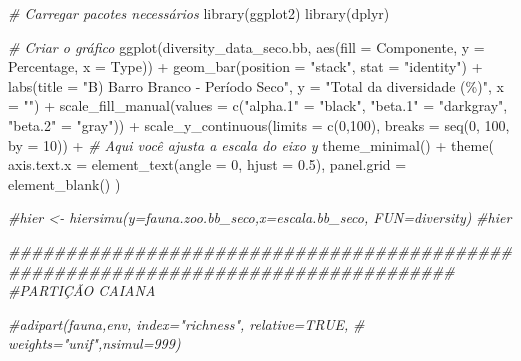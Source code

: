 \documentclass[
  letterpaper,
  DIV=11,
  numbers=noendperiod]{scrartcl}
\newenvironment{Shaded}{}{}
\newcommand{\AttributeTok}[1]{\textcolor[rgb]{0.49,0.56,0.16}{#1}}
\newcommand{\CommentTok}[1]{\textcolor[rgb]{0.38,0.63,0.69}{\textit{#1}}}
\newcommand{\DecValTok}[1]{\textcolor[rgb]{0.25,0.63,0.44}{#1}}
\newcommand{\DocumentationTok}[1]{\textcolor[rgb]{0.73,0.13,0.13}{\textit{#1}}}
\newcommand{\FloatTok}[1]{\textcolor[rgb]{0.25,0.63,0.44}{#1}}
\newcommand{\FunctionTok}[1]{\textcolor[rgb]{0.02,0.16,0.49}{#1}}
\newcommand{\NormalTok}[1]{#1}
\newcommand{\OtherTok}[1]{\textcolor[rgb]{0.00,0.44,0.13}{#1}}
\newcommand{\SpecialCharTok}[1]{\textcolor[rgb]{0.25,0.44,0.63}{#1}}
\newcommand{\StringTok}[1]{\textcolor[rgb]{0.25,0.44,0.63}{#1}}
\begin{document}
\begin{Shaded}
\begin{Highlighting}[numbers=left,,]
\CommentTok{\# Carregar pacotes necessários}
\FunctionTok{library}\NormalTok{(ggplot2)}
\FunctionTok{library}\NormalTok{(dplyr)}

\CommentTok{\# Criar o gráfico}
\FunctionTok{ggplot}\NormalTok{(diversity\_data\_seco.bb, }\FunctionTok{aes}\NormalTok{(}\AttributeTok{fill =}\NormalTok{ Componente, }\AttributeTok{y =}\NormalTok{ Percentage, }\AttributeTok{x =}\NormalTok{ Type)) }\SpecialCharTok{+}
  \FunctionTok{geom\_bar}\NormalTok{(}\AttributeTok{position =} \StringTok{"stack"}\NormalTok{, }\AttributeTok{stat =} \StringTok{"identity"}\NormalTok{) }\SpecialCharTok{+}
  \FunctionTok{labs}\NormalTok{(}\AttributeTok{title =} \StringTok{"B) Barro Branco {-} Período Seco"}\NormalTok{,}
       \AttributeTok{y =} \StringTok{"Total da diversidade (\%)"}\NormalTok{,}
       \AttributeTok{x =} \StringTok{""}\NormalTok{) }\SpecialCharTok{+}
  \FunctionTok{scale\_fill\_manual}\NormalTok{(}\AttributeTok{values =} \FunctionTok{c}\NormalTok{(}\StringTok{"alpha.1"} \OtherTok{=} \StringTok{"black"}\NormalTok{,}
                               \StringTok{"beta.1"} \OtherTok{=} \StringTok{"darkgray"}\NormalTok{,}
                               \StringTok{"beta.2"} \OtherTok{=} \StringTok{"gray"}\NormalTok{)) }\SpecialCharTok{+}
  \FunctionTok{scale\_y\_continuous}\NormalTok{(}\AttributeTok{limits =} \FunctionTok{c}\NormalTok{(}\DecValTok{0}\NormalTok{,}\DecValTok{100}\NormalTok{), }\AttributeTok{breaks =} \FunctionTok{seq}\NormalTok{(}\DecValTok{0}\NormalTok{, }\DecValTok{100}\NormalTok{, }\AttributeTok{by =} \DecValTok{10}\NormalTok{)) }\SpecialCharTok{+} \CommentTok{\# Aqui você ajusta a escala do eixo y}
  \FunctionTok{theme\_minimal}\NormalTok{() }\SpecialCharTok{+}
  \FunctionTok{theme}\NormalTok{(}
    \AttributeTok{axis.text.x =} \FunctionTok{element\_text}\NormalTok{(}\AttributeTok{angle =} \DecValTok{0}\NormalTok{, }\AttributeTok{hjust =} \FloatTok{0.5}\NormalTok{),}
    \AttributeTok{panel.grid =} \FunctionTok{element\_blank}\NormalTok{()}
\NormalTok{  )}

\CommentTok{\#hier \textless{}{-} hiersimu(y=fauna.zoo.bb\_seco,x=escala.bb\_seco, FUN=diversity)}
\CommentTok{\#hier}

\DocumentationTok{\#\#\#\#\#\#\#\#\#\#\#\#\#\#\#\#\#\#\#\#\#\#\#\#\#\#\#\#\#\#\#\#\#\#\#\#\#\#\#\#\#\#\#\#\#\#\#\#\#\#\#\#\#\#\#\#\#\#\#\#\#\#\#\#\#\#\#\#\#\#\#\#\#\#\#\#\#\#\#\#\#\#\#}
\CommentTok{\#PARTIÇÃO CAIANA}

\CommentTok{\#adipart(fauna,env, index="richness", relative=TRUE,}
\CommentTok{\#        weights="unif",nsimul=999)}


\end{Highlighting}
\end{Shaded}
\end{document}
